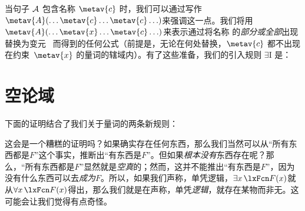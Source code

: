 当句子 $\mathcal{A}$ 包含名称 $\metav{c}$ 时，我们可以通过写作$\metav{A}(\ldots \metav{c} \ldots
\metav{c}\ldots)$来强调这一点。我们将用$\metav{A}(\ldots \metav{x} \ldots
\metav{c}\ldots)$来表示通过将名称  的\emph{部分或全部}出现替换为变元~ 而得到的任何公式（前提是，无论在何处替换，$\metav{c}$ 都不出现在约束~$\metav{x}$ 的量词的辖域内）。有了这些准备，我们的引入规则 $\exists$I 是：

\section{空论域}
下面的证明结合了我们关于量词的两条新规则：


\begin{fitchproof}
		\PR
	\end{fitchproof}


这会是一个糟糕的证明吗？如果确实存在任何东西，那么我们当然可以从“所有东西都是$F$”这个事实，推断出“有东西是$F$”。但如果\emph{根本没有}东西存在呢？那么，“所有东西都是$F$”显然就是\emph{空真}的；然而，这并不能推出“有东西是$F$”，因为没有什么东西可以去\emph{成为}$F$。所以，如果我们声称，单凭逻辑，$\exists x\,\atom{F}{x}$就从$\forall x\,\atom{F}{x}$得出，那么我们就是在声称，单凭\emph{逻辑}，就存在某物而非无。这可能会让我们觉得有点奇怪。


